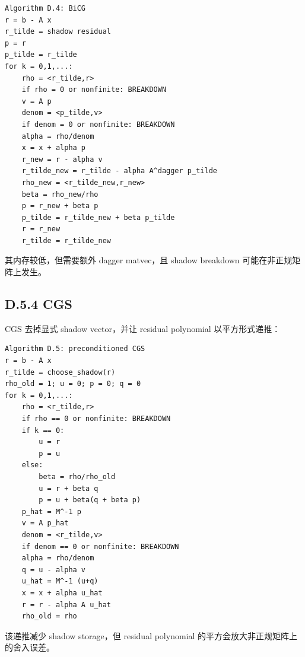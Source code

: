\documentclass[UTF8,a4paper,10pt]{ctexart}
\begin{document}
\begin{Verbatim}[breaklines=true,breakanywhere=true,fontsize=\scriptsize]
Algorithm D.4: BiCG
r = b - A x
r_tilde = shadow residual
p = r
p_tilde = r_tilde
for k = 0,1,...:
    rho = <r_tilde,r>
    if rho = 0 or nonfinite: BREAKDOWN
    v = A p
    denom = <p_tilde,v>
    if denom = 0 or nonfinite: BREAKDOWN
    alpha = rho/denom
    x = x + alpha p
    r_new = r - alpha v
    r_tilde_new = r_tilde - alpha A^dagger p_tilde
    rho_new = <r_tilde_new,r_new>
    beta = rho_new/rho
    p = r_new + beta p
    p_tilde = r_tilde_new + beta p_tilde
    r = r_new
    r_tilde = r_tilde_new
\end{Verbatim}
其内存较低，但需要额外 dagger matvec，且 shadow breakdown 可能在非正规矩阵上发生。

\subsection{D.5.4 CGS}
CGS 去掉显式 shadow vector，并让 residual polynomial 以平方形式递推：

\begin{Verbatim}[breaklines=true,breakanywhere=true,fontsize=\scriptsize]
Algorithm D.5: preconditioned CGS
r = b - A x
r_tilde = choose_shadow(r)
rho_old = 1; u = 0; p = 0; q = 0
for k = 0,1,...:
    rho = <r_tilde,r>
    if rho == 0 or nonfinite: BREAKDOWN
    if k == 0:
        u = r
        p = u
    else:
        beta = rho/rho_old
        u = r + beta q
        p = u + beta(q + beta p)
    p_hat = M^-1 p
    v = A p_hat
    denom = <r_tilde,v>
    if denom == 0 or nonfinite: BREAKDOWN
    alpha = rho/denom
    q = u - alpha v
    u_hat = M^-1 (u+q)
    x = x + alpha u_hat
    r = r - alpha A u_hat
    rho_old = rho
\end{Verbatim}
该递推减少 shadow storage，但 residual polynomial 的平方会放大非正规矩阵上的舍入误差。
\end{document}
